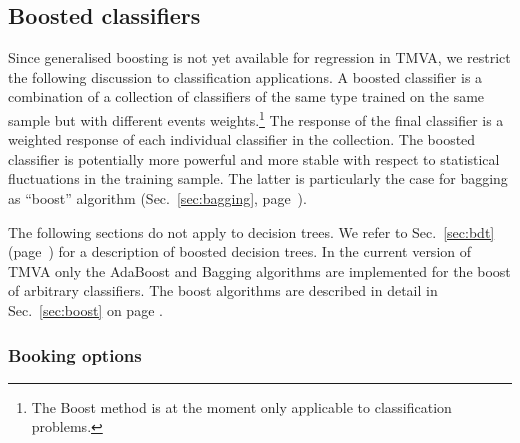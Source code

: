 \subsection{Boosted classifiers}
\label{sec:boosted}

Since generalised boosting is not yet available for regression in TMVA, we 
restrict the following discussion to classification applications.
A boosted classifier is a combination of a
collection of classifiers of the same type trained on the same sample
but with different events weights.\footnote{The Boost method is at the
  moment only applicable to classification problems.} The response of
the final classifier is a weighted response of each individual
classifier in the collection. The boosted classifier is potentially
more powerful and more stable with respect to statistical fluctuations
in the training sample.  The latter is particularly the case for
bagging as ``boost'' algorithm (\cf Sec.~\ref{sec:bagging}, page~\pageref{sec:bagging}).

The following sections do not apply to decision trees. We refer to
Sec.~\ref{sec:bdt} (page~\pageref{sec:bdt}) for a description of boosted 
decision trees. In the current version of TMVA only the AdaBoost and Bagging 
algorithms are implemented for the boost of arbitrary classifiers.  The boost
algorithms are described in detail in Sec.~\ref{sec:boost} on page
\pageref{sec:boost}.

\subsubsection{Booking options}

